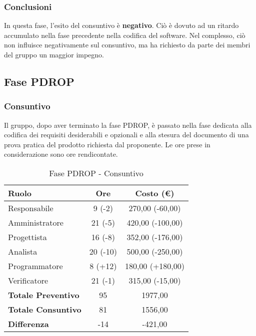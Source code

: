\documentclass[../PianoProgetto.tex]{subfiles}
\begin{document}
	\subsubsection{Conclusioni}	
     In questa fase, l'esito del consuntivo è \textbf{negativo}. 
     Ciò è dovuto ad un ritardo accumulato nella fase precedente nella codifica del software\g. Nel complesso, ciò non influisce negativamente sul consuntivo, ma ha richiesto da parte dei membri del gruppo un maggior impegno.
     
     
     \subsection{Fase PDROP}
	\subsubsection{Consuntivo}
	Il gruppo, dopo aver terminato la fase PDROP, è passato nella fase dedicata alla codifica dei requisiti desiderabili e opzionali e alla stesura del documento di una prova pratica del prodotto richiesta dal proponente. Le ore prese in considerazione sono ore rendicontate.
	
	\newpage
	\begin{table}[h]
		\centering
		\begin{tabular}{l * {2}{c}}
			\toprule
			\textbf{Ruolo} & \textbf{Ore} & \textbf{Costo (\euro{})} \\
			\midrule
			Responsabile &		9 (-2) & 270,00 (-60,00) \\
			Amministratore &	21 (-5) & 420,00  (-100,00) \\
			Progettista & 		16 (-8) & 352,00  (-176,00)\\
			Analista & 			20	(-10)	& 500,00   (-250,00)       \\
			Programmatore & 	8	(+12)	& 180,00 	(+180,00)			\\
			Verificatore & 		21 (-1) & 315,00 (-15,00)	\\
			\midrule
			\textbf{Totale Preventivo} & 95
			& 1977,00
			\\		
			\textbf{Totale Consuntivo} & 81 & 1556,00
			\\
			\midrule
			\textbf{Differenza} & -14 & -421,00 \\
			\bottomrule
		\end{tabular}
		
		\caption{Fase PDROP - Consuntivo}
		\label{tab:consuntivoPDROP}
		
	\end{table}			
	
\end{document}
